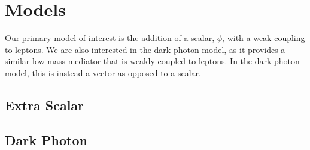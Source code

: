 \section{Models}

Our primary model of interest is the addition of a scalar, $\phi$, with a weak coupling to leptons.
We are also interested in the dark photon model, as it provides a similar low mass mediator that is weakly coupled to leptons.
In the dark photon model, this is instead a vector as opposed to a scalar.

\subsection{Extra Scalar}

\subsection{Dark Photon}

